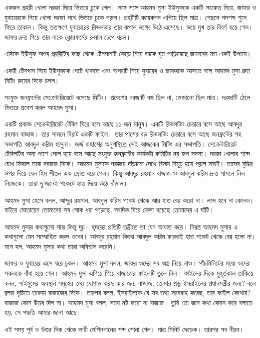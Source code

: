 \documentclass[
]{book}
\begin{document}
একজন প্রহরী খোলা দরজা দিয়ে ভিতরে ঢুকে গেল। সঙ্গে সঙ্গে আহমদ মুসা ইউসুফকে একটি সংকেত দিয়ে, জাফর ও যুবায়েরকে নিয়ে খোলা দরজা পথে ভিতরে ঢুকে পড়ল। প্রহরীটি কয়েকপদ এগিয়ে ছিল মাত্র। পেছনে পদশব্দ শুনে ফিরে তাকাল। কিন্তু ততক্ষণে যুবায়েরের রিভলভার তার কপাল লক্ষ্যে উঠে এসেছে। ভয়ে মুখ তার বিবর্ণ হয়ে গেল। জাফর দ্রুত গিয়ে তার নাকে ক্লোরফর্মের রুমাল চেপে ধরল।

এদিকে ইউসুফ অপর প্রহরীটির কাছ থেকে ষ্টেনগানটি কেড়ে নিয়ে তাকে ঘুম পাড়িয়েছে জাফরের মত একই উপায়ে।

একটি ষ্টেনগান নিয়ে ইউসুফকে গেটে থাকতে এবং অপরটি নিয়ে যুবায়ের ও জাফরকে আসতে বলে আহমদ মুসা দ্রুত মিটিং রুমের দিকে চলল।

সংযুক্ত জনফ্রন্টের সেক্রেটারিয়েটে বসেছে মিটিং। প্রবেশের দরজাটি বন্ধ ছিল না, ভেজানো ছিল মাত্র। দরজাটি ঠেলে ভিতরে প্রবেশ করল আহমদ মুসা।

একটি প্রকান্ড সেক্রেটারিয়েট টেবিল ঘিরে বসে আছে ১১ জন মানুষ। একটি রিভলভিং চেয়ারে বসে আছে আবদুর রহমান বাজাজ। তার সামনে বিরাট একটি ফাইল। তার পাশের বড় রিভলভিং চেয়ারে বসে আছে জনফ্রন্টের সহ সভাপতি আবদুল করিম হাসুনা। জর্জ বাহাশের অনুপস্থিতে সেই আজকের মিটিং এর সভাপতি। সেক্রেটারিয়েট টেবিলটির অন্য পাশে গোল হয়ে বসে আছে সংযুক্ত জনফ্রন্টের কার্যকরী কমিটির নয় জন সদস্য। দরজা খোলার শব্দে চোখ ফিরাল তারা দরজার দিকে। আহমদ মুসাকে দরজায় দাঁড়ানো দেখে বিস্ময় বিমূঢ় হয়ে পড়ল সবাই। তাদের বুদ্ধির উপর দিয়ে যেন হিম শীতল এক স্রোত বয়ে গেল। কিন্তু আবদুর রহমান বাজাজ ও আবদুল করিম দ্রুত সামলে নিল নিজেকে। তারা দু'জনেই পকেটে হাত দিয়ে উঠে দাঁড়াল।

আহমদ মুসা হেসে বলল, আব্দুর রহমান, আবদুল করিম পকেট থেকে আর হাত বের করো না। লাভ হবে না কোনও। বাইরে মোতায়েন তোমাদের সব লোক ধরা পড়েছে, সবদিক ঘিরে ফেলা হয়েছে তোমাদের এ ঘাঁটি।

আহমদ মুসার কথাগুলো শান্ত কিন্তু দৃঢ়। হৃদয়ের প্রতিটি তন্ত্রীতে তা যেন আঘাত করে। নিরস্ত্র আহমদ মুসার এ কথাগুলো যেন সম্মোহিত করল ওদের। আবদুর রহমান কিংবা আবদুল করিম কারুরই হাত পকেট থেকে বের হলো না। মনে হল, আহমদ মুসার কথা তারা অবিশ্বাস করেনি।

জাফর ও যুবায়ের এসে ঘরে ঢুকল। আহমদ মুসা বলল, জাফর ওদের সব অস্ত্র নিয়ে নাও। পাঁচমিনিটের মধ্যে ওদের সকলকে বাঁধা হয়ে গেল। আহমদ মুসা এগিয়ে গিয়ে বাজাজের ফাইলটি তুলে নিল। ফাইলের দিকে মুহূর্তকাল তাকিয়ে বলল, সাইমুমের অবস্থান সমূহের তথ্য যোগাড় করছ কার জন্য বাজাজ, তোমার প্রভু ইসরাইলের প্রধানমন্ত্রীর জন্য? বলে জ্বলন্ত দৃষ্টিতে তাকায় বাজাজের দিকে। তারপর বলল, ইসরাইলকে যে সব তথ্য সরবরাহ করেছ, তার ফাইল কোথায়? বাজাজ কোন উত্তর দিল না। আহমদ মুসা বলল, সময় নষ্ট করো না বাজাজ। তুমি তো জান কথা কেমন করে বলাতে হয়, সে পদ্ধতি আমার জানা আছে।

এই সময় পূর্ব ও উত্তর দিক থেকে ভারী মেশিনগানের শব্দ শোনা গেল। মাত্র মিনিট দেড়েক। তারপর সব নীরব।
\end{document}
